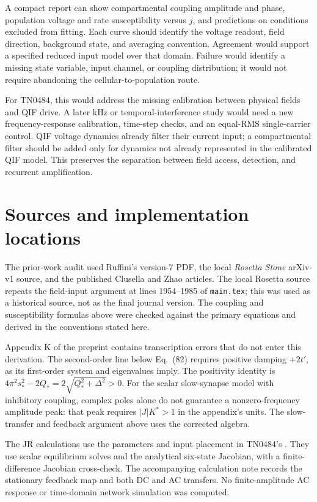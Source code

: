 \documentclass[11pt,a4paper]{article}
\begin{document}
A compact report can show compartmental coupling amplitude and phase, population voltage and rate susceptibility versus $j$, and predictions on conditions excluded from fitting. Each curve should identify the voltage readout, field direction, background state, and averaging convention. Agreement would support a specified reduced input model over that domain. Failure would identify a missing state variable, input channel, or coupling distribution; it would not require abandoning the cellular-to-population route.

For TN0484, this would address the missing calibration between physical fields and QIF drive. A later kHz or temporal-interference study would need a new frequency-response calibration, time-step checks, and an equal-RMS single-carrier control. QIF voltage dynamics already filter their current input; a compartmental filter should be added only for dynamics not already represented in the calibrated QIF model. This preserves the separation between field access, detection, and recurrent amplification.

\appendix
\section{Sources and implementation locations}

The prior-work audit used Ruffini's version-7 PDF, the local \emph{Rosetta Stone} arXiv-v1 source, and the published Clusella and Zhao articles. The local Rosetta source repeats the field-input argument at lines 1954--1985 of \texttt{main.tex}; this was used as a historical source, not as the final journal version. The coupling and susceptibility formulas above were checked against the primary equations and derived in the conventions stated here.

Appendix K of the preprint contains transcription errors that do not enter this derivation. The second-order line below Eq.~(82) requires positive damping $+2t'$, as its first-order system and eigenvalues imply. The positivity identity is $4\pi^2s_*^2-2Q_*=2\sqrt{Q_*^2+\Delta^2}>0$. For the scalar slow-synapse model with inhibitory coupling, complex poles alone do not guarantee a nonzero-frequency amplitude peak: that peak requires $|J|K^*>1$ in the appendix's units. The slow-transfer and feedback argument above uses the corrected algebra.

The JR calculations use the parameters and input placement in TN0484's . They use scalar equilibrium solves and the analytical six-state Jacobian, with a finite-difference Jacobian cross-check. The accompanying calculation note records the stationary feedback map and both DC and AC transfers. No finite-amplitude AC response or time-domain network simulation was computed.
\end{document}
